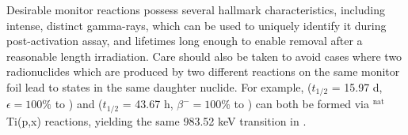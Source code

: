 Desirable monitor reactions 
possess several hallmark characteristics,  
including intense, distinct gamma-rays, 
which can be used to uniquely identify it during post-activation assay, and lifetimes long enough to enable removal after a reasonable length irradiation.    
Care should also be taken to avoid cases where two radionuclides which are produced by two different reactions on the same monitor foil lead to states in the same daughter nuclide.  
For example,   ($t_{1/2}$ = 15.97 d, $\epsilon=100\%$ to ) and   ($t_{1/2}$ = 43.67 h, $\beta^-=100\%$ to ) can both be formed via $^\text{nat}$Ti(p,x) reactions, yielding the same 983.52 keV transition in  \cite{Burrows2006}.
